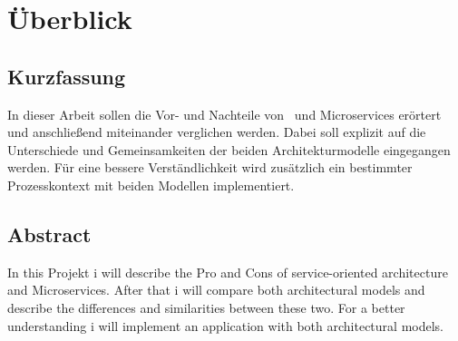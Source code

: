 \chapter*{Überblick}
\section*{Kurzfassung}
In dieser Arbeit sollen die Vor- und Nachteile von \SOA\ und Microservices erörtert und anschließend miteinander verglichen werden. Dabei soll explizit auf die Unterschiede und Gemeinsamkeiten der beiden Architekturmodelle eingegangen werden. Für eine bessere Verständlichkeit wird zusätzlich ein bestimmter Prozesskontext mit beiden Modellen implementiert.

\section*{Abstract}
In this Projekt i will describe the Pro and Cons of service-oriented architecture and Microservices. After that i will compare both architectural models and describe the differences and similarities between these two. For a better understanding i will implement an application with both architectural models.